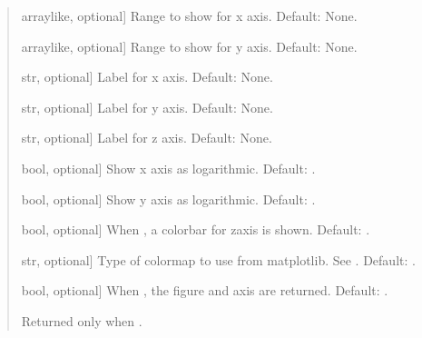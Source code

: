 \documentclass[letterpaper,10pt,english]{sphinxmanual}
\begin{document}
\begin{fulllineitems}
\begin{quote}
\begin{description}
\begin{description}
\sphinxlineitem{\sphinxstylestrong{range\_x}}{[}array\sphinxhyphen{}like, optional{]}
\sphinxAtStartPar
Range to show for x axis. Default: None.

\sphinxlineitem{\sphinxstylestrong{range\_y}}{[}array\sphinxhyphen{}like, optional{]}
\sphinxAtStartPar
Range to show for y axis. Default: None.

\sphinxlineitem{\sphinxstylestrong{xlabel}}{[}str, optional{]}
\sphinxAtStartPar
Label for x axis. Default: None.

\sphinxlineitem{\sphinxstylestrong{ylabel}}{[}str, optional{]}
\sphinxAtStartPar
Label for y axis. Default: None.

\sphinxlineitem{\sphinxstylestrong{zlabel}}{[}str, optional{]}
\sphinxAtStartPar
Label for z axis. Default: None.

\sphinxlineitem{\sphinxstylestrong{xlog}}{[}bool, optional{]}
\sphinxAtStartPar
Show x axis as logarithmic. Default: .

\sphinxlineitem{\sphinxstylestrong{ylog}}{[}bool, optional{]}
\sphinxAtStartPar
Show y axis as logarithmic. Default: .

\sphinxlineitem{\sphinxstylestrong{colorbar}}{[}bool, optional{]}
\sphinxAtStartPar
When , a colorbar for zaxis is shown. Default: .

\sphinxlineitem{\sphinxstylestrong{cmap}}{[}str, optional{]}
\sphinxAtStartPar
Type of colormap to use from matplotlib.
See .
Default: .

\sphinxlineitem{\sphinxstylestrong{returns}}{[}bool, optional{]}
\sphinxAtStartPar
When , the figure and axis are returned. Default: .

\end{description}

\begin{description}
\sphinxAtStartPar
Returned only when .

\end{description}

\end{description}\end{quote}

\end{fulllineitems}

\end{document}
